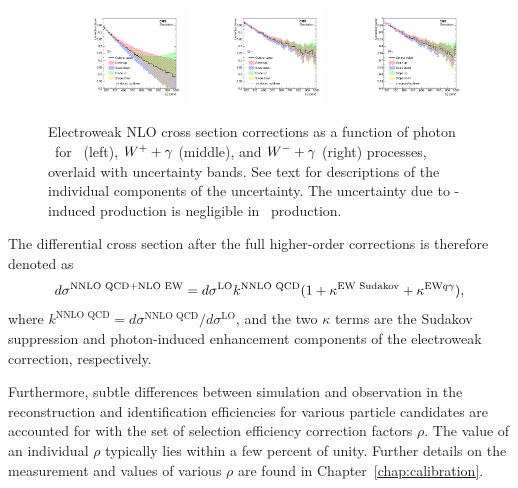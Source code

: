 \begin{figure}[htbp]
  \centering
  \includegraphics[width=0.32\textwidth]{Analysis/Figures/ewkcorr/zg.pdf}
  \includegraphics[width=0.32\textwidth]{Analysis/Figures/ewkcorr/wgplus.pdf}
  \includegraphics[width=0.32\textwidth]{Analysis/Figures/ewkcorr/wgminus.pdf}
  \caption{
    Electroweak NLO cross section corrections as a function of photon \pt\ for \zinvg\ (left), ${W}^{+}+\gamma$ (middle), and ${W}^{-}+\gamma$ (right) processes, overlaid with uncertainty bands. 
    See text for descriptions of the individual components of the uncertainty.
    The uncertainty due to \Pgg-induced production is negligible in \zinvg\ production.
  }
  \label{fig:ewk_correction}
\end{figure}

The differential cross section after the full higher-order corrections is therefore denoted as
\begin{equation}
  d\sigma^{\text{NNLO QCD}+\text{NLO EW}} = d\sigma^{\text{LO}} k^{\text{NNLO QCD}} (1 + \kappa^{\text{EW Sudakov}} + \kappa^{\text{EW} {q}\gamma}),
\end{equation}
where $k^{\text{NNLO QCD}} = d\sigma^{\text{NNLO QCD}} / d\sigma^{\text{LO}}$, and the two $\kappa$ terms are the Sudakov suppression and photon-induced enhancement components of the electroweak
correction, respectively.

Furthermore, subtle differences between simulation and observation in the reconstruction and identification efficiencies for various particle candidates are accounted for with the set of selection efficiency correction factors $\rho$. 
The value of an individual $\rho$ typically lies within a few percent of unity. 
Further details on the measurement and values of various $\rho$ are found in Chapter~\ref{chap:calibration}.

